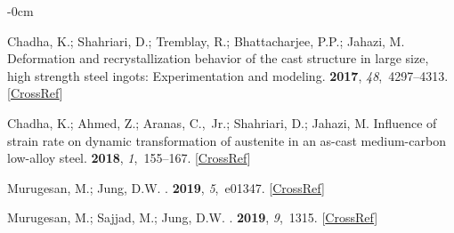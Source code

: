 \documentclass[metals,article,accept,pdftex,moreauthors]{Definitions/mdpi}
\begin{document}
\begin{adjustwidth}{-\extralength}{0cm}



\begin{thebibliography}{999}

Chadha, K.; Shahriari, D.; Tremblay, R.; Bhattacharjee, P.P.; Jahazi, M.
\newblock Deformation and recrystallization behavior of the cast structure in
large size, high strength steel ingots: Experimentation and modeling.
 {\bf 2017}, {\em
48},~4297--4313. [\href{http://doi.org/10.1007/s11661-017-4177-8}{CrossRef}]

Chadha, K.; Ahmed, Z.; Aranas, C.,~Jr.; Shahriari, D.; Jahazi, M.
\newblock Influence of strain rate on dynamic transformation of austenite in an
as-cast medium-carbon low-alloy steel.
 {\bf 2018}, {\em 1},~155--167. [\href{http://dx.doi.org/10.1016/j.mtla.2018.04.006}{CrossRef}]

Murugesan, M.; Jung, D.W.
.
 {\bf 2019}, {\em 5},~e01347. [\href{http://dx.doi.org/10.1016/j.heliyon.2019.e01347}{CrossRef}]

Murugesan, M.; Sajjad, M.; Jung, D.W.
.
 {\bf 2019}, {\em 9},~1315. [\href{http://dx.doi.org/10.3390/met9121315}{CrossRef}]


\end{thebibliography}
\end{adjustwidth}
\end{document}
